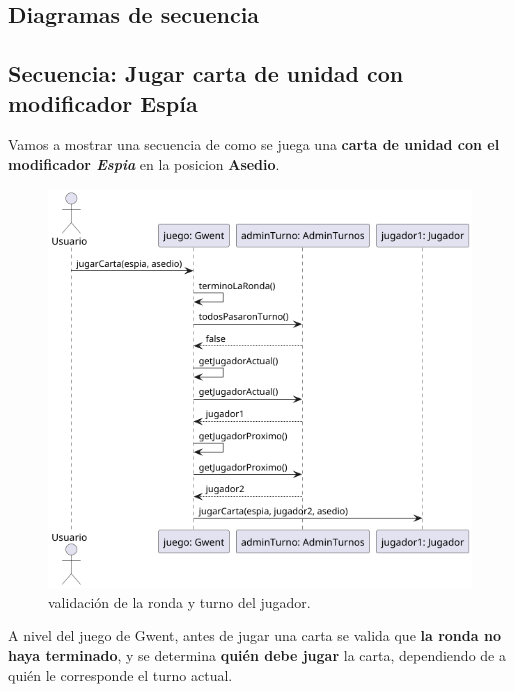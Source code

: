 \documentclass[titlepage,a4paper]{article}
\begin{document}
	\subsection{Diagramas de secuencia}\label{sec:diagramasdesecuencia}

	\subsection{Secuencia: Jugar carta de unidad con modificador Espía}
	Vamos a mostrar una secuencia de como se juega una \textbf{carta de unidad con el modificador \textit{Espia}} en la posicion \textbf{Asedio}.

	\begin{figure}[H]
		\centering
		\includegraphics[width=1\textwidth]{diagramas/secuencia/jugarCarta1}
		\caption{\label{fig:secuencia01} validación de la ronda y turno del jugador.}
	\end{figure}
	A nivel del juego de Gwent, antes de jugar una carta se valida que \textbf{la ronda no haya terminado}, y se determina \textbf{quién debe jugar} la carta, dependiendo de a quién le corresponde el turno actual.
\end{document}
